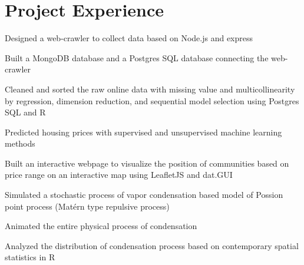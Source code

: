 \documentclass[]{Current-DS}
\begin{document}
\begin{minipage}[t]{0.66\textwidth} 


\section{Project Experience}

\descript{}
\vspace{\topsep} %
\begin{tightemize}
\item Designed a web-crawler to collect data based on Node.js and express
\item Built a MongoDB database and a Postgres SQL database connecting the web-crawler  
\item Cleaned and sorted the raw online data with missing value and multicollinearity by regression, dimension reduction, and sequential model selection using Postgres SQL and R
\item Predicted housing prices with supervised and unsupervised machine learning methods
\item Built an interactive webpage to visualize the position of communities based on price range on an interactive map using LeafletJS and dat.GUI
\end{tightemize}
\sectionsep

\descript{}
\vspace{\topsep} %
\begin{tightemize}
\item Simulated a stochastic process of vapor condensation based model of Possion point process (Mat\'{e}rn type repulsive process)
\item Animated the entire physical process of condensation
\item Analyzed the distribution of condensation process based on contemporary spatial statistics in R
\end{tightemize}
\sectionsep


\end{minipage}
\end{document}
